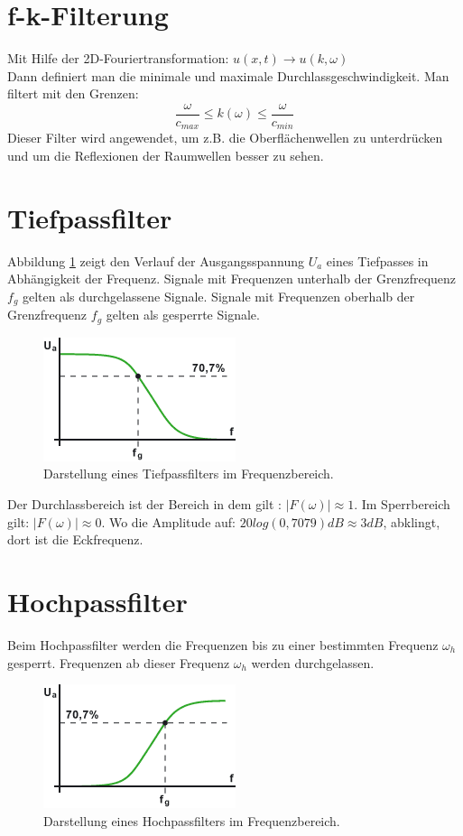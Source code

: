 \section{f-k-Filterung}
Mit Hilfe der 2D-Fouriertransformation: $u(x,t)\longrightarrow u(k,\omega)$\\
Dann definiert man die minimale und maximale Durchlassgeschwindigkeit. Man filtert mit den Grenzen: \\
\begin{equation*}
\dfrac{\omega}{c_{max}}\leq k(\omega)\leq \frac{\omega}{c_{min}}
\end{equation*}
Dieser Filter wird angewendet, um z.B. die Oberflächenwellen zu unterdrücken und um die Reflexionen der Raumwellen besser zu sehen.

\section{Tiefpassfilter}
Abbildung \ref{fig:filt_tiefpass} zeigt den Verlauf der Ausgangsspannung $U_a$ eines Tiefpasses in Abhängigkeit der Frequenz. Signale mit Frequenzen unterhalb der Grenzfrequenz $f_g$ gelten als durchgelassene Signale. Signale mit Frequenzen oberhalb der Grenzfrequenz $f_g$ gelten als gesperrte Signale.\\
\begin{figure}[h!]
\centering
\includegraphics[width=.4\tw]{fig/08-Filter/tiefpass.png}
\caption{Darstellung eines Tiefpassfilters im Frequenzbereich.}
\label{fig:filt_tiefpass}
\end{figure}
Der Durchlassbereich ist der Bereich in dem gilt : $\vert F(\omega) \vert \approx 1 $.
Im Sperrbereich gilt: $\vert F(\omega) \vert \approx 0 $. Wo die Amplitude auf: 
$20log(0,7079)dB \approx 3dB$,  abklingt, dort ist die Eckfrequenz.

\section{Hochpassfilter}
Beim Hochpassfilter werden die Frequenzen bis zu einer bestimmten Frequenz $\omega_{h}$  gesperrt. Frequenzen ab dieser Frequenz $\omega_{h}$ werden durchgelassen.
\begin{figure}[h!]
\centering
\includegraphics[width=.4\tw]{fig/08-Filter/hochpass.png}
\caption{Darstellung eines Hochpassfilters im Frequenzbereich.}
\end{figure}

